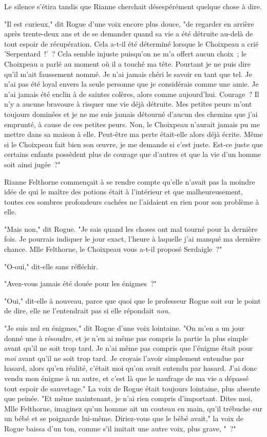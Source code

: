 Le silence s'étira tandis que Rianne cherchait désespérément quelque chose à dire.

"Il est curieux," dit Rogue d'une voix encore plus douce, "de regarder en arrière après trente-deux ans et de se demander quand sa vie a été détruite au-delà de tout espoir de récupération. Cela a-t-il été déterminé lorsque le Choixpeau a crié 'Serpentard~!'~? Cela semble injuste puisqu'on ne m'a offert aucun choix~; le Choixpeau a parlé au moment où il a touché ma tête. Pourtant je ne puis dire qu'il m'ait faussement nommé. Je n'ai jamais chéri le savoir en tant que tel. Je n'ai pas été loyal envers la seule personne que je considérais comme une amie. Je n'ai jamais été enclin à de saintes colères, alors comme aujourd'hui. Courage~? Il n'y a aucune bravoure à risquer une vie déjà détruite. Mes petites peurs m'ont toujours dominées et je ne me suis jamais détourné d'aucun des chemins que j'ai emprunté, à cause de ces petites peurs. Non, le Choixpeau n'aurait jamais pu me mettre dans sa maison à elle. Peut-être ma perte était-elle alors déjà écrite. Même si le Choixpeau fait bien son œuvre, je me demande si c'est juste. Est-ce juste que certains enfants possèdent plus de courage que d'autres et que la vie d'un homme soit ainsi jugée~?"

Rianne Felthorne commençait à se rendre compte qu'elle n'avait pas la moindre idée de qui le maître des potions était à l'intérieur et que malheureusement, toutes ces sombres profondeurs cachées ne l'aidaient en rien pour son problème à elle.

"Mais non," dit Rogue. "Je sais quand les choses ont mal tourné pour la dernière fois. Je pourrais indiquer le jour exact, l'heure à laquelle j'ai manqué ma dernière chance. Mlle Felthorne, le Choixpeau vous a-t-il proposé Serdaigle~?"

"O-oui," dit-elle sans réfléchir.

"Avez-vous jamais été douée pour les énigmes~?"

"Oui," dit-elle à nouveau, parce que quoi que le professeur Rogue soit sur le point de dire, elle ne l'entendrait pas si elle répondait \emph{non}.

"Je suis nul en énigmes," dit Rogue d'une voix lointaine. "On m'en a un jour donné une à résoudre, et je n'en ai même pas compris la partie la plus simple avant qu'il ne soit trop tard. Je n'ai même pas compris que l'énigme était pour \emph{moi} avant qu'il ne soit trop tard. Je croyais l'avoir simplement entendue par hasard, alors qu'en réalité, c'était moi qu'on avait entendu par hasard. J'ai donc vendu mon énigme à un autre, et c'est là que le naufrage de ma vie a dépassé tout espoir de sauvetage." La voix de Rogue était toujours lointaine, plus absente que peinée. "Et même maintenant, je n'ai rien compris d'important. Dites moi, Mlle Felthorne, imaginez qu'un homme ait un couteau en main, qu'il trébuche sur un bébé et se poignarde lui-même. Diriez-vous que le bébé avait," la voix de Rogue baissa d'un ton, comme s'il imitait une autre voix, plus grave, "~?"

